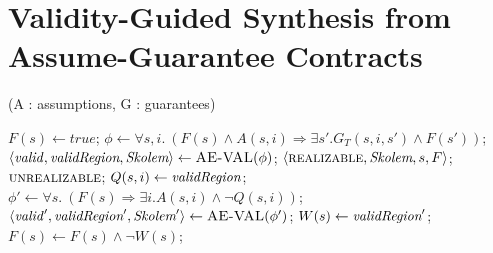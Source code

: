\section{Validity-Guided Synthesis from Assume-Guarantee Contracts}
\label{sec:synthesis}

\begin{algorithm*}[!t]
\caption{\jsynvg (A : assumptions, G : guarantees)}
\label{alg:synthesis}
\begin{algorithmic}[1]
	\State $F(s) \gets \mathit{true}$\label{alg:init};
		\State $\phi \gets \forall s,i. \ (F(s) \land A(s,i) \Rightarrow \exists s'.G_{T}(s,i,s') \land F(s'))$\label{alg:ae1};
		\State $\langle \mathit{valid}, \textit{validRegion}, \textit{Skolem} \rangle \gets \textsc{AE-VAL}(\phi) \label{alg:val1}$;
				\Return $\langle \textsc{realizable}, \textit{Skolem}, s, F \rangle$\label{alg:issat};
		 		\Return $\textsc{unrealizable}$;
		 	\EndIf
			\State $Q(s,i) \gets \textit{validRegion}$\label{alg:valreg};
			\State $\phi' \gets \forall s. \ (F(s) \Rightarrow \exists i. A(s,i) \land \lnot
			Q(s,i))$\label{alg:ae2};
			\State $\langle \mathit{valid}', \textit{validRegion}', \textit{Skolem}' \rangle \gets \textsc{AE-VAL}(\phi')$;
				\State $W(s) \gets \textit{validRegion}'$;
			\State $F(s) \gets F(s) \land \lnot W(s)$\label{alg:rem};	
			
				
		\EndIf
	\EndWhile
\end{algorithmic}
\end{algorithm*}


